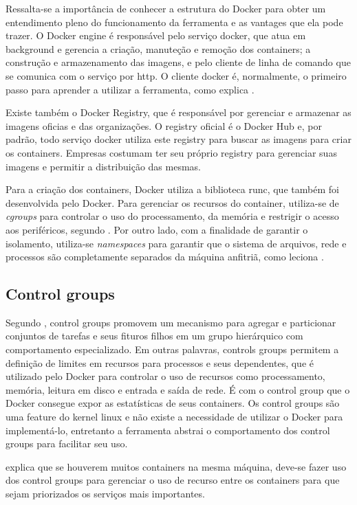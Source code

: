 \documentclass[
	12pt,				%
	openright,			%
	oneside,			%
	a4paper,			%
	chapter=TITLE,		%
	section=TITLE,		%
	english,			%
	french,				%
	spanish,			%
	brazil				%
	]{abntex2}
\begin{document}
Ressalta-se a importância de conhecer a estrutura do Docker para obter um entendimento pleno do funcionamento da ferramenta e as vantages que ela pode trazer. O Docker engine é responsável pelo serviço docker, que atua em background e gerencia a criação, manuteção e remoção dos containers; a construção e armazenamento das imagens, e pelo cliente de linha de comando que se comunica com o serviço por http. O cliente docker é, normalmente, o primeiro passo para aprender a utilizar a ferramenta, como explica .

Existe também o Docker Registry, que é responsável por gerenciar e armazenar as imagens oficias e das organizações. O registry oficial é o Docker Hub e, por padrão, todo serviço docker utiliza este registry para buscar as imagens para criar os containers. Empresas costumam ter seu próprio registry para gerenciar suas imagens e permitir a distribuição das mesmas.

Para a criação dos containers, Docker utiliza a biblioteca runc, que também foi desenvolvida pelo Docker. Para gerenciar os recursos do container, utiliza-se de \textit{cgroups} para controlar o uso do processamento, da memória e restrigir o acesso aos periféricos, segundo . Por outro lado, com a finalidade de garantir o isolamento, utiliza-se \textit{namespaces} para garantir que o sistema de arquivos, rede e processos são completamente separados da máquina anfitriã, como leciona .

\subsection{Control groups}

Segundo , control groups promovem um mecanismo para agregar e particionar conjuntos de tarefas e seus fituros filhos em um grupo hierárquico com comportamento especializado. Em outras palavras, controls groups permitem a definição de limites em recursos para processos e seus dependentes, que é utilizado pelo Docker para controlar o uso de recursos como processamento, memória, leitura em disco e entrada e saída de rede. É com o control group que o Docker consegue expor as estatísticas de seus containers. Os control groups são uma feature do kernel linux e não existe a necessidade de utilizar o Docker para implementá-lo, entretanto a ferramenta abstrai o comportamento dos control groups para facilitar seu uso.

 explica que se houverem muitos containers na mesma máquina, deve-se fazer uso dos control groups para gerenciar o uso de recurso entre os containers para que sejam priorizados os serviços mais importantes.
\end{document}
